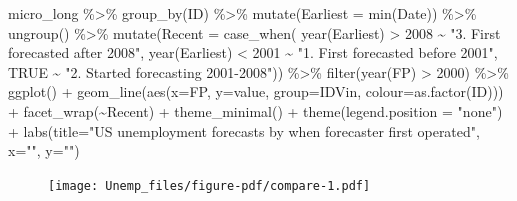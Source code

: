 \documentclass[
  letterpaper,
]{book}
\newenvironment{Shaded}{\begin{snugshade}}{\end{snugshade}}
\newcommand{\AttributeTok}[1]{\textcolor[rgb]{0.40,0.45,0.13}{#1}}
\newcommand{\ConstantTok}[1]{\textcolor[rgb]{0.56,0.35,0.01}{#1}}
\newcommand{\DecValTok}[1]{\textcolor[rgb]{0.68,0.00,0.00}{#1}}
\newcommand{\FunctionTok}[1]{\textcolor[rgb]{0.28,0.35,0.67}{#1}}
\newcommand{\NormalTok}[1]{\textcolor[rgb]{0.00,0.23,0.31}{#1}}
\newcommand{\SpecialCharTok}[1]{\textcolor[rgb]{0.37,0.37,0.37}{#1}}
\newcommand{\StringTok}[1]{\textcolor[rgb]{0.13,0.47,0.30}{#1}}
\begin{document}
\begin{Shaded}
\begin{Highlighting}[]
\NormalTok{micro\_long }\SpecialCharTok{\%\textgreater{}\%}
  \FunctionTok{group\_by}\NormalTok{(ID) }\SpecialCharTok{\%\textgreater{}\%} 
  \FunctionTok{mutate}\NormalTok{(}\AttributeTok{Earliest =} \FunctionTok{min}\NormalTok{(Date)) }\SpecialCharTok{\%\textgreater{}\%} 
  \FunctionTok{ungroup}\NormalTok{() }\SpecialCharTok{\%\textgreater{}\%} 
  \FunctionTok{mutate}\NormalTok{(}\AttributeTok{Recent =} \FunctionTok{case\_when}\NormalTok{(}
    \FunctionTok{year}\NormalTok{(Earliest) }\SpecialCharTok{\textgreater{}} \DecValTok{2008} \SpecialCharTok{\textasciitilde{}} \StringTok{"3. First forecasted after 2008"}\NormalTok{,}
    \FunctionTok{year}\NormalTok{(Earliest) }\SpecialCharTok{\textless{}} \DecValTok{2001} \SpecialCharTok{\textasciitilde{}} \StringTok{"1. First forecasted before 2001"}\NormalTok{,}
    \ConstantTok{TRUE}                  \SpecialCharTok{\textasciitilde{}} \StringTok{"2. Started forecasting 2001{-}2008"}\NormalTok{)) }\SpecialCharTok{\%\textgreater{}\%} 
  \FunctionTok{filter}\NormalTok{(}\FunctionTok{year}\NormalTok{(FP) }\SpecialCharTok{\textgreater{}} \DecValTok{2000}\NormalTok{) }\SpecialCharTok{\%\textgreater{}\%}
  \FunctionTok{ggplot}\NormalTok{() }\SpecialCharTok{+} 
  \FunctionTok{geom\_line}\NormalTok{(}\FunctionTok{aes}\NormalTok{(}\AttributeTok{x=}\NormalTok{FP, }\AttributeTok{y=}\NormalTok{value, }\AttributeTok{group=}\NormalTok{IDVin, }\AttributeTok{colour=}\FunctionTok{as.factor}\NormalTok{(ID))) }\SpecialCharTok{+}
  \FunctionTok{facet\_wrap}\NormalTok{(}\SpecialCharTok{\textasciitilde{}}\NormalTok{Recent) }\SpecialCharTok{+} 
  \FunctionTok{theme\_minimal}\NormalTok{() }\SpecialCharTok{+}
  \FunctionTok{theme}\NormalTok{(}\AttributeTok{legend.position =} \StringTok{"none"}\NormalTok{) }\SpecialCharTok{+} 
  \FunctionTok{labs}\NormalTok{(}\AttributeTok{title=}\StringTok{"US unemployment forecasts by when forecaster first operated"}\NormalTok{, }\AttributeTok{x=}\StringTok{""}\NormalTok{, }\AttributeTok{y=}\StringTok{""}\NormalTok{)}
\end{Highlighting}
\end{Shaded}

\begin{figure}[H]

{\centering \texttt{[image: Unemp\_files/figure-pdf/compare-1.pdf]}

}

\end{figure}
\end{document}
